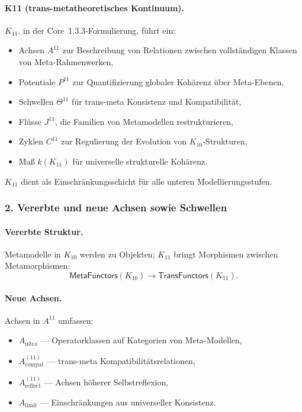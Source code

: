 \paragraph{K11 (trans-metatheoretisches Kontinuum).}
$K_{11}$, in der Core~1.3.3-Formulierung, führt ein:
\begin{itemize}
  \item Achsen $A^{11}$ zur Beschreibung von Relationen zwischen vollständigen
        Klassen von Meta-Rahmenwerken,
  \item Potentiale $P^{11}$ zur Quantifizierung globaler Kohärenz über Meta-Ebenen,
  \item Schwellen $\Theta^{11}$ für trans-meta Konsistenz und Kompatibilität,
  \item Flüsse $J^{11}$, die Familien von Metamodellen restrukturieren,
  \item Zyklen $C^{11}$ zur Regulierung der Evolution von $K_{10}$-Strukturen,
  \item Maß $k(K_{11})$ für universelle strukturelle Kohärenz.
\end{itemize}

$K_{11}$ dient als Einschränkungsschicht für alle unteren Modellierungsstufen.

\subsubsection{2. Vererbte und neue Achsen sowie Schwellen}

\paragraph{Vererbte Struktur.}
Metamodelle in $K_{10}$ werden zu Objekten; $K_{11}$ bringt Morphismen zwischen
Metamorphismen:
\[
\mathsf{MetaFunctors}(K_{10}) \rightarrow \mathsf{TransFunctors}(K_{11}).
\]

\paragraph{Neue Achsen.}
Achsen in $A^{11}$ umfassen:
\begin{itemize}
  \item $A_{\mathrm{ultra}}$ — Operatorklassen auf Kategorien von Meta-Modellen,
  \item $A_{\mathrm{compat}}^{(11)}$ — trans-meta Kompatibilitätsrelationen,
  \item $A_{\mathrm{reflect}}^{(11)}$ — Achsen höherer Selbstreflexion,
  \item $A_{\mathrm{limit}}$ — Einschränkungen aus universeller Konsistenz.
\end{itemize}

